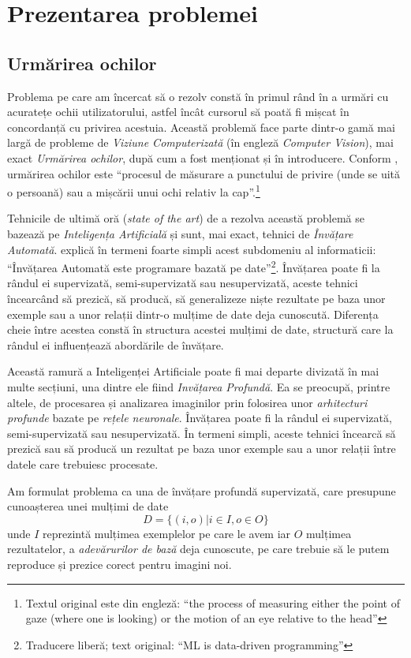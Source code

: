 \chapter{Prezentarea problemei}
\label{chapter1}
\section{Urmărirea ochilor}
Problema pe care am încercat să o rezolv constă în primul rând în a urmări cu acuratețe ochii utilizatorului, astfel încât cursorul să poată fi mișcat în concordanță cu privirea acestuia.
Această problemă face parte dintr-o gamă mai largă de probleme de \emph{Viziune Computerizată} (în engleză \emph{Computer Vision}), mai exact \emph{Urmărirea ochilor}, după cum a fost menționat și în introducere.
Conform \cite{eye_tracking}, urmărirea ochilor este ``procesul de măsurare a punctului de privire (unde se uită o persoană) sau a mișcării unui ochi relativ la cap''.\footnote{Textul original este din engleză: ``the process of measuring either the point of gaze (where one is looking) or the motion of an eye relative to the head''}

Tehnicile de ultimă oră (\emph{state of the art}) de a rezolva această problemă se bazează pe \emph{Inteligența Artificială} și sunt, mai exact, tehnici de \emph{Învățare Automată}.
\cite{liviu_ciortuz_ml} explică în termeni foarte simpli acest subdomeniu al informaticii: ``Învățarea Automată este programare bazată pe date''\footnote{Traducere liberă; text original: ``ML is data-driven programming''}.
Învățarea poate fi la rândul ei supervizată, semi-supervizată sau nesupervizată, aceste tehnici încearcând să prezică, să producă, să generalizeze niște rezultate pe baza unor exemple sau a unor relații dintr-o mulțime de date deja cunoscută.
Diferența cheie între acestea constă în structura acestei mulțimi de date, structură care la rândul ei influențează abordările de învățare.

Această ramură a Inteligenței Artificiale poate fi mai departe divizată în mai multe secțiuni, una dintre ele fiind \emph{Invățarea Profundă}.
Ea se preocupă, printre altele, de procesarea și analizarea imaginilor prin folosirea unor \emph{arhitecturi profunde} bazate pe \emph{rețele neuronale}.
Învățarea poate fi la rândul ei supervizată, semi-supervizată sau nesupervizată.
În termeni simpli, aceste tehnici încearcă să prezică sau să producă un rezultat pe baza unor exemple sau a unor relații între datele care trebuiesc procesate.

Am formulat problema ca una de învățare profundă supervizată, care presupune cunoașterea unei mulțimi de date
$$D = \{(i, o) | i \in I, o \in O\}$$
unde $I$ reprezintă mulțimea exemplelor pe care le avem iar $O$ mulțimea rezultatelor, a \emph{adevărurilor de bază} deja cunoscute, pe care trebuie să le putem reproduce și prezice corect pentru imagini noi.

